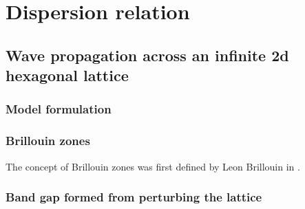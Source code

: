 \chapter{Dispersion relation}

\section{Wave propagation across an infinite 2d hexagonal lattice}

\subsection{Model formulation}

\subsection{Brillouin zones}
The concept of Brillouin zones was first defined by Leon Brillouin in
\cite{brillouin}.

\subsection{Band gap formed from perturbing the lattice}
